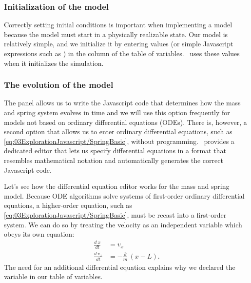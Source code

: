 \subsubsection{Initialization of the model}
Correctly setting initial conditions is important when implementing a model because the model must start in a
physically realizable state. Our model is relatively simple, and we initialize it by entering values (or simple Javascript
expressions such as ) in the  column of the table of variables. \ejs\ uses these values when it initializes the simulation.


\subsubsection{The evolution of the model}

The  panel allows us to write the Javascript code that determines how the mass and spring system evolves in time and we will use this option frequently for models not based on ordinary differential equations (ODEs). There is, however, a second option that allows us to enter ordinary differential equations, such as \eqref{eq:03ExplorationJavascript/SpringBasic}, without programming.  \ejs\ provides a dedicated editor that lets us specify differential equations in a format that resembles mathematical
notation and automatically generates the correct Javascript code.

Let's see how the differential equation editor works for the mass and spring model. Because ODE algorithms solve
systems of first-order ordinary differential equations, a higher-order equation, such as
\eqref{eq:03ExplorationJavascript/SpringBasic}, must be recast into a first-order system.   We can do so by treating the
velocity as an independent variable which obeys its own equation:
\begin{align}
  \frac{d\ x} {dt} &= v_x                           \label{eq:03ExplorationJavascript/SpringBasicODE1} \\
  \frac{d\ v_x}{dt} &= -\frac{k}{m}\,(x-L). \label{eq:03ExplorationJavascript/SpringBasicODE2}
\end{align}
The need for an additional differential equation explains why we declared the  variable in our table of
variables.

